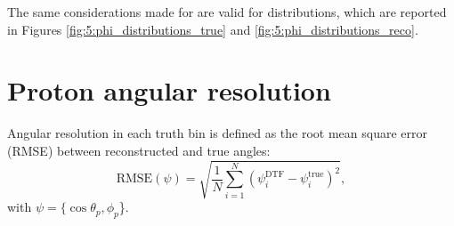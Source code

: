 The same considerations made for \cthetap are valid for \phip distributions, which are reported in Figures \ref{fig:5:phi_distributions_true} and \ref{fig:5:phi_distributions_reco}.

\section{Proton angular resolution}
\label{sec:5:angular_resolution}

Angular resolution in each truth bin is defined as the root mean square error (RMSE) between reconstructed and true angles:
\begin{equation}
	\text{RMSE}(\psi) = \sqrt{\frac{1}{N} \sum_{i=1}^N {\left(\psi_i^\text{DTF} - \psi_i^\text{true}\right)}^2},
\end{equation}
with $\psi = \{\cos\theta_p, \phi_p$\}.

